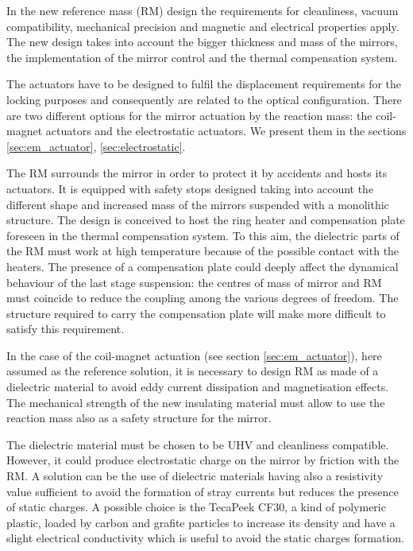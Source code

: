 In the new reference mass (RM)  design the requirements for cleanliness, vacuum compatibility, mechanical precision and magnetic and electrical properties apply.  The new design takes into account the bigger thickness and mass of the mirrors, the implementation of the mirror control and the thermal compensation system. 

The actuators have to be designed to fulfil the displacement requirements for the locking purposes and consequently are related to the optical configuration. There are two different options for the mirror actuation by the reaction mass: the coil-magnet actuators and the electrostatic actuators. We present them in the  sections \ref{sec:em_actuator}, \ref{sec:electrostatic}.

The RM surrounds the mirror in order to protect it by accidents and hosts its actuators. It is equipped with safety stops designed taking into account the different shape and increased mass of the mirrors suspended with a monolithic structure. 
The design is conceived to host the ring heater and compensation plate foreseen in the thermal compensation system. To this aim, the dielectric parts of the RM must work at high temperature because of the possible contact with the heaters. 
The presence of a compensation plate could deeply affect the dynamical behaviour of the last stage suspension: the centres of mass of mirror and RM must coincide to reduce the coupling among the various degrees of freedom. The structure required to carry the compensation plate will make more difficult to satisfy this requirement. 

In the case of the coil-magnet actuation (see section \ref{sec:em_actuator}), here assumed as the reference solution,  it is necessary to design RM as made of  a dielectric material to avoid eddy current dissipation and magnetisation effects. The mechanical strength of the new insulating material must allow to use the reaction mass also as a safety structure for the mirror.

The dielectric material must be chosen to be UHV and cleanliness compatible. However,  it could produce   electrostatic charge on the mirror  by friction with the RM. A solution can be the use of dielectric materials having also a resistivity value sufficient to avoid the formation of stray currents but reduces the presence of static charges. A possible choice is the TecaPeek CF30, a kind of polymeric plastic, loaded by carbon and grafite particles to increase its density and have a slight electrical conductivity which is useful to avoid the static charges formation. 
 
